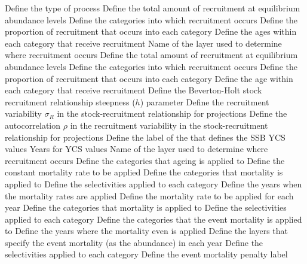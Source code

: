 {Define the type of process}
 {Define the total amount of recruitment at equilibrium abundance levels}
 {Define the categories into which recruitment occurs}
 {Define the proportion of recruitment that occurs into each category}
 {Define the ages within each category that receive recruitment}
 {Name of the layer used to determine where recruitment occurs}
 {Define the total amount of recruitment at equilibrium abundance levels}
 {Define the categories into which recruitment occurs}
 {Define the proportion of recruitment that occurs into each category}
 {Define the age within each category that receive recruitment}
 {Define the Beverton-Holt stock recruitment relationship steepness ($h$) parameter}
 {Define the recruitment variability $\sigma_R$ in the stock-recruitment relationship for projections}
 {Define the autocorrelation $\rho$ in the recruitment variability in the stock-recruitment relationship for projections}
 {Define the label of the  that defines the SSB}
 {YCS values}
 {Years for YCS values}
 {Name of the layer used to determine where recruitment occurs}
 {Define the categories that ageing is applied to}
 {Define the constant mortality rate to be applied}
 {Define the categories that mortality is applied to}
 {Define the selectivities applied to each category}
 {Define the years when the mortality rates are applied}
 {Define the mortality rate to be applied for each year}
 {Define the categories that mortality is applied to}
 {Define the selectivities applied to each category}
 {Define the categories that the event mortality is applied to}
 {Define the years where the mortality even is applied}
 {Define the layers that specify the event mortality (as the abundance) in each year}
 {Define the selectivities applied to each category}
 {Define the event mortality penalty label}
